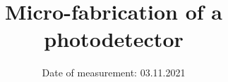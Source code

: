 

\subject{\vspace{-4cm}Labreport 3}  %
\title{\vspace{-0.5cm}Micro-fabrication of a photodetector} %
\date{\vspace{-0.5cm}
 Date of measurement: 03.11.2021  %
}




\twocolumn[
\maketitle
\begin{onecolabstract}
  
\end{onecolabstract}
]






\printbibliography{}


